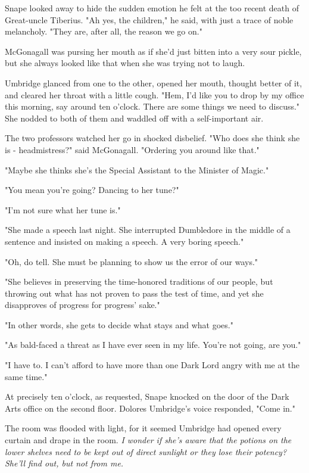 Snape looked away to hide the sudden emotion he felt at the too recent death of Great-uncle Tiberius. "Ah yes, the children," he said, with just a trace of noble melancholy. "They are, after all, the reason we go on."

McGonagall was pursing her mouth as if she'd just bitten into a very sour pickle, but she always looked like that when she was trying not to laugh.

Umbridge glanced from one to the other, opened her mouth, thought better of it, and cleared her throat with a little cough. "Hem, I'd like you to drop by my office this morning, say around ten o'clock. There are some things we need to discuss." She nodded to both of them and waddled off with a self-important air.

The two professors watched her go in shocked disbelief. "Who does she think she is - headmistress?" said McGonagall. "Ordering you around like that."

"Maybe she thinks she's the Special Assistant to the Minister of Magic."

"You mean you're going? Dancing to her tune?"

"I'm not sure what her tune is."

"She made a speech last night. She interrupted Dumbledore in the middle of a sentence and insisted on making a speech. A very boring speech."

"Oh, do tell. She must be planning to show us the error of our ways."

"She believes in preserving the time-honored traditions of our people, but throwing out what has not proven to pass the test of time, and yet she disapproves of progress for progress' sake."

"In other words, she gets to decide what stays and what goes."

"As bald-faced a threat as I have ever seen in my life. You're not going, are you."

"I have to. I can't afford to have more than one Dark Lord angry with me at the same time."

At precisely ten o'clock, as requested, Snape knocked on the door of the Dark Arts office on the second floor. Dolores Umbridge's voice responded, "Come in."

The room was flooded with light, for it seemed Umbridge had opened every curtain and drape in the room. \emph{I wonder if she's aware that the potions on the lower shelves need to be kept out of direct sunlight or they lose their potency? She'll find out, but not from me.}

